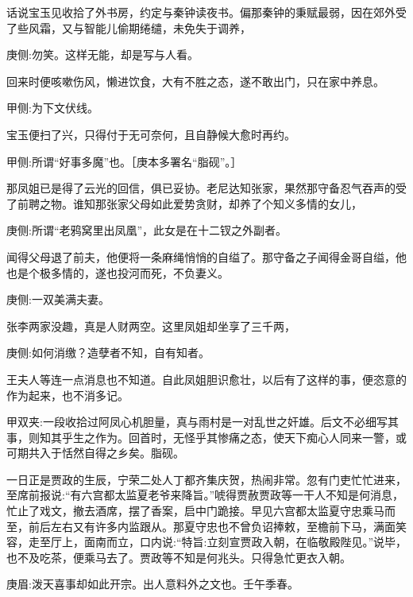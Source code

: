 \begin{parag}
    话说宝玉见收拾了外书房，约定与秦钟读夜书。偏那秦钟的秉赋最弱，因在郊外受了些风霜，又与智能儿偷期绻缱，未免失于调养，\begin{note}庚侧:勿笑。这样无能，却是写与人看。\end{note}回来时便咳嗽伤风，懒进饮食，大有不胜之态，遂不敢出门，只在家中养息。\begin{note}甲侧:为下文伏线。\end{note}宝玉便扫了兴，只得付于无可奈何，且自静候大愈时再约。\begin{note}甲侧:所谓“好事多魔”也。［庚本多署名“脂砚”。］\end{note}
\end{parag}


\begin{parag}
    那凤姐已是得了云光的回信，俱已妥协。老尼达知张家，果然那守备忍气吞声的受了前聘之物。谁知那张家父母如此爱势贪财，却养了个知义多情的女儿，\begin{note}庚侧:所谓“老鸦窝里出凤凰”，此女是在十二钗之外副者。\end{note}闻得父母退了前夫，他便将一条麻绳悄悄的自缢了。那守备之子闻得金哥自缢，他也是个极多情的，遂也投河而死，不负妻义。\begin{note}庚侧:一双美满夫妻。\end{note}张李两家没趣，真是人财两空。这里凤姐却坐享了三千两，\begin{note}庚侧:如何消缴？造孽者不知，自有知者。\end{note}王夫人等连一点消息也不知道。自此凤姐胆识愈壮，以后有了这样的事，便恣意的作为起来，也不消多记。\begin{note}甲双夹:一段收拾过阿凤心机胆量，真与雨村是一对乱世之奸雄。后文不必细写其事，则知其乎生之作为。回首时，无怪乎其惨痛之态，使天下痴心人同来一警，或可期共入于恬然自得之乡矣。脂砚。\end{note}
\end{parag}


\begin{parag}
    一日正是贾政的生辰，宁荣二处人丁都齐集庆贺，热闹非常。忽有门吏忙忙进来，至席前报说:“有六宫都太监夏老爷来降旨。”唬得贾赦贾政等一干人不知是何消息，忙止了戏文，撤去酒席，摆了香案，启中门跪接。早见六宫都太监夏守忠乘马而至，前后左右又有许多内监跟从。那夏守忠也不曾负诏捧敕，至檐前下马，满面笑容，走至厅上，面南而立，口内说:“特旨:立刻宣贾政入朝，在临敬殿陛见。”说毕，也不及吃茶，便乘马去了。贾政等不知是何兆头。只得急忙更衣入朝。\begin{note}庚眉:泼天喜事却如此开宗。出人意料外之文也。壬午季春。\end{note}
\end{parag}


